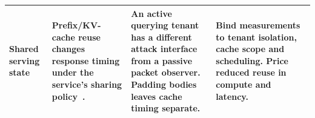 \begin{table}[t]
\begin{tabularx}{\textwidth}{@{}P{.18\textwidth}P{.28\textwidth}P{.25\textwidth}Y@{}}
Shared serving state & Prefix/KV-cache reuse changes response timing under the service's sharing policy~\cite{earlybird2025,carlini2024timing}. & An active querying tenant has a different attack interface from a passive packet observer. Padding bodies leaves cache timing separate. & Bind measurements to tenant isolation, cache scope and scheduling. Price reduced reuse in compute and latency. \\\bottomrule
\end{tabularx}
\end{table}
